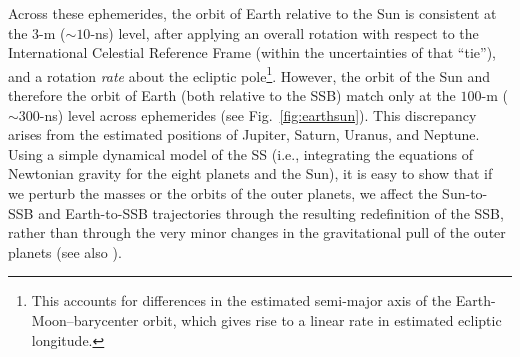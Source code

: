 \documentclass[iop,apj,twocolappendix]{emulateapj}
\begin{document}
Across these ephemerides, the orbit of Earth relative to the Sun is consistent at the $3$-m ($\sim 10$-ns) level, after applying an overall rotation with respect to the International Celestial Reference Frame (within the uncertainties of that ``tie''), and a rotation \emph{rate} about the ecliptic pole\footnote{\label{footnote:rate}This accounts for differences in the estimated semi-major axis of the Earth-Moon--barycenter orbit, which gives rise to a linear rate in estimated ecliptic longitude.}.
However, the orbit of the Sun and therefore the orbit of Earth (both relative to the SSB) match only at the $100$-m ($\sim 300$-ns) level across ephemerides (see Fig.\ \ref{fig:earthsun}). This discrepancy arises from the estimated positions of Jupiter, Saturn, Uranus, and Neptune. Using a simple dynamical model of the SS (i.e., integrating the equations of Newtonian gravity for the eight planets and the Sun), it is easy to show that if we perturb the masses or the orbits of the outer planets, we affect the Sun-to-SSB and Earth-to-SSB trajectories through the resulting redefinition of the SSB, rather than through the very minor changes in the gravitational pull of the outer planets (see also \citealt{2019MNRAS.489.5573G}).
%
\end{document}
